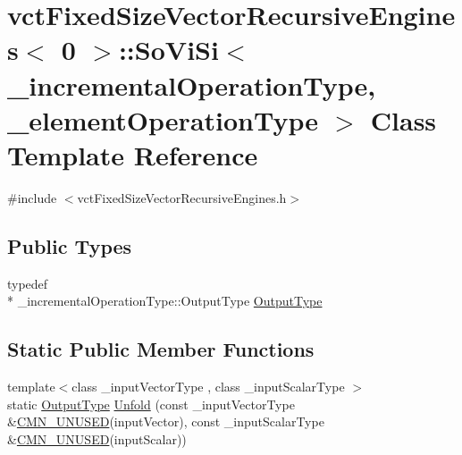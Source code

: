 \hypertarget{classvct_fixed_size_vector_recursive_engines_3_010_01_4_1_1_so_vi_si}{\section{vct\-Fixed\-Size\-Vector\-Recursive\-Engines$<$ 0 $>$\-:\-:So\-Vi\-Si$<$ \-\_\-incremental\-Operation\-Type, \-\_\-element\-Operation\-Type $>$ Class Template Reference}
\label{classvct_fixed_size_vector_recursive_engines_3_010_01_4_1_1_so_vi_si}
}


{\ttfamily \#include $<$vct\-Fixed\-Size\-Vector\-Recursive\-Engines.\-h$>$}

\subsection*{Public Types}
\begin{DoxyCompactItemize}
\item 
typedef \\*
\-\_\-incremental\-Operation\-Type\-::\-Output\-Type \hyperlink{classvct_fixed_size_vector_recursive_engines_3_010_01_4_1_1_so_vi_si_a70b81b3e115af7d2eae3f8ce4e2cbf8d}{Output\-Type}
\end{DoxyCompactItemize}
\subsection*{Static Public Member Functions}
\begin{DoxyCompactItemize}
\item 
{\footnotesize template$<$class \-\_\-input\-Vector\-Type , class \-\_\-input\-Scalar\-Type $>$ }\\static \hyperlink{classvct_fixed_size_vector_recursive_engines_3_010_01_4_1_1_so_vi_si_a70b81b3e115af7d2eae3f8ce4e2cbf8d}{Output\-Type} \hyperlink{classvct_fixed_size_vector_recursive_engines_3_010_01_4_1_1_so_vi_si_aac9cebf0381d8506372963e26ed99ee9}{Unfold} (const \-\_\-input\-Vector\-Type \&\hyperlink{cmn_portability_8h_a021894e2626935fa2305434b1e893ff6}{C\-M\-N\-\_\-\-U\-N\-U\-S\-E\-D}(input\-Vector), const \-\_\-input\-Scalar\-Type \&\hyperlink{cmn_portability_8h_a021894e2626935fa2305434b1e893ff6}{C\-M\-N\-\_\-\-U\-N\-U\-S\-E\-D}(input\-Scalar))
\end{DoxyCompactItemize}


